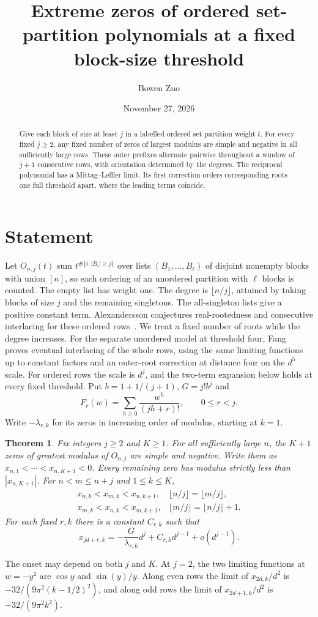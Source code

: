 \documentclass[11pt]{amsart}
\title[Extreme zeros of ordered set partitions]{Extreme zeros of ordered set-partition polynomials at a fixed block-size threshold}
\author{Bowen Zuo}
\date{November 27, 2026}
\newtheorem{theorem}{Theorem}
\begin{document}
\begin{abstract}
Give each block of size at least $j$ in a labelled ordered set partition
weight $t$. For every fixed $j\ge2$, any fixed number of zeros of
largest modulus are simple and negative in all sufficiently large rows.
These outer prefixes alternate pairwise throughout a window of $j+1$
consecutive rows, with orientation determined by the degrees. The
reciprocal polynomial has a Mittag--Leffler limit. Its first correction
orders corresponding roots one full threshold apart, where the leading
terms coincide.
\end{abstract}
\maketitle

\section{Statement}
Let $O_{n,j}(t)$ sum $t^{\#\{i:|B_i|\ge j\}}$ over lists
$(B_1,\ldots,B_\ell)$ of disjoint nonempty blocks with union $[n]$,
so each ordering of an unordered partition with $\ell$ blocks is counted.
The empty list has weight one. The degree is $\lfloor n/j\rfloor$,
attained by taking blocks of size $j$ and the remaining singletons.
The all-singleton lists give a positive constant term. Alexandersson
conjectures real-rootedness and consecutive interlacing for these
ordered rows~\cite{catalog}. We treat a fixed number of roots while
the degree increases. For the separate unordered model at threshold four,
Fang~\cite[Theorems 1 and 4]{fang} proves eventual interlacing of the
whole rows, using the same limiting functions up to constant factors
and an outer-root correction at distance four on the $d^5$ scale.
For ordered rows the scale is $d^j$, and the two-term expansion below
holds at every fixed threshold. Put
$b=1+1/(j+1)$, $G=j!b^j$ and
\[
 F_r(w)=\sum_{h\ge0}\frac{w^h}{(jh+r)!},\qquad 0\le r<j .
\]
Write $-\lambda_{r,k}$ for its zeros in increasing order of modulus,
starting at $k=1$.

\begin{theorem}\label{thm}
Fix integers $j\ge2$ and $K\ge1$. For all sufficiently large $n$,
the $K+1$ zeros of greatest modulus of $O_{n,j}$ are simple and negative.
Write them as $x_{n,1}<\cdots<x_{n,K+1}<0$. Every remaining
zero has modulus strictly less than $|x_{n,K+1}|$.
For $n<m\le n+j$ and $1\le k\le K$,
\[
\begin{array}{ll}
 x_{n,k}<x_{m,k}<x_{n,k+1},&\lfloor n/j\rfloor=\lfloor m/j\rfloor,\\
 x_{m,k}<x_{n,k}<x_{m,k+1},&\lfloor m/j\rfloor=\lfloor n/j\rfloor+1.
\end{array}
\]
For each fixed $r,k$ there is a constant $C_{r,k}$ such that
\[
 x_{jd+r,k}=-\frac{G}{\lambda_{r,k}}d^j+C_{r,k}d^{j-1}+o(d^{j-1}).
\]
\end{theorem}
The onset may depend on both $j$ and $K$. At $j=2$, the two limiting
functions at $w=-y^2$ are $\cos y$ and $\sin(y)/y$. Along even rows
the limit of $x_{2d,k}/d^2$ is $-32/(9\pi^2(k-1/2)^2)$, and along
odd rows the limit of $x_{2d+1,k}/d^2$ is $-32/(9\pi^2k^2)$.
\end{document}
